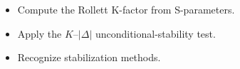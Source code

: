 \begin{objectives}
\begin{itemize}[leftmargin=1.4em,itemsep=2pt]
\item Compute the Rollett K-factor from S-parameters.
\item Apply the $K$--$|\Delta|$ unconditional-stability test.
\item Recognize stabilization methods.
\end{itemize}
\end{objectives}
